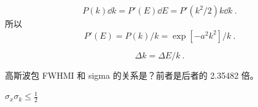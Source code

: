 
\begin{equation}
P(k)\dd{k} = P'(E)\dd{E} = P'(k^2/2)k\dd{k}~.
\end{equation}
所以
\begin{equation}
P'(E) = P(k)/k = \exp[-a^2 k^2]/k~.
\end{equation}

\begin{equation}
\Delta k = \Delta E/k~.
\end{equation}

高斯波包 FWHMI 和 sigma 的关系是？前者是后者的 2.35482 倍。

$\sigma_x \sigma_k \leq \frac{1}{2}$